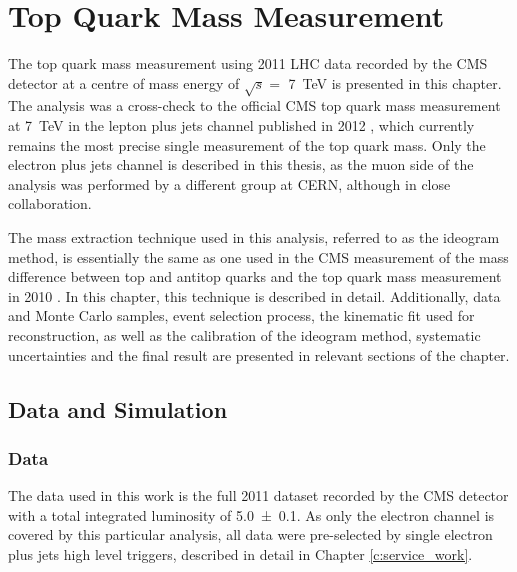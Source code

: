 
\chapter{Top Quark Mass Measurement}
\label{c:top_mass_analysis}
\ifpdf
    \graphicspath{{05_Mass_analysis/plots/}}
\else
    \graphicspath{{05_Mass_analysis/plots/EPS/}{05_Mass_analysis/plots/}}
\fi

The top quark mass measurement using 2011 LHC data recorded by the CMS detector at a centre of mass energy of $\sqrt s
=$ \SI{7}{\TeV} is presented in this chapter. The analysis was a cross-check to the official CMS top quark mass
measurement at \SI{7}{\TeV} in the lepton plus jets channel published in 2012 \autocite{top_mass_ljets_CMS}, which
currently remains the most precise single measurement of the top quark mass. Only the electron plus jets channel is
described in this thesis, as the muon side of the analysis was performed by a different group at CERN, although in close
collaboration.

The mass extraction technique used in this analysis, referred to as the ideogram method, is essentially the same as one
used in the CMS measurement of the mass difference between top and antitop quarks \autocite{mass_difference_CMS} and the
top quark mass measurement in 2010 \autocite{top_mass_ljets_CMS_2010}. In this chapter, this technique is described in
detail. Additionally, data and Monte Carlo samples, event selection process, the kinematic fit used for \ttbar
reconstruction, as well as the calibration of the ideogram method, systematic uncertainties and the final result are
presented in relevant sections of the chapter.

\section{Data and Simulation}
\label{s_top_mass:data_and_simulation}

\subsection{Data}
\label{ss_top_mass:data}
The data used in this work is the full 2011 dataset recorded by the CMS detector with a total integrated luminosity of
\SI{5.0 \pm 0.1}{\fbinv}. As only the electron channel is covered by this particular analysis, all data were
pre-selected by single electron plus jets high level triggers, described in detail in Chapter \ref{c:service_work}.

